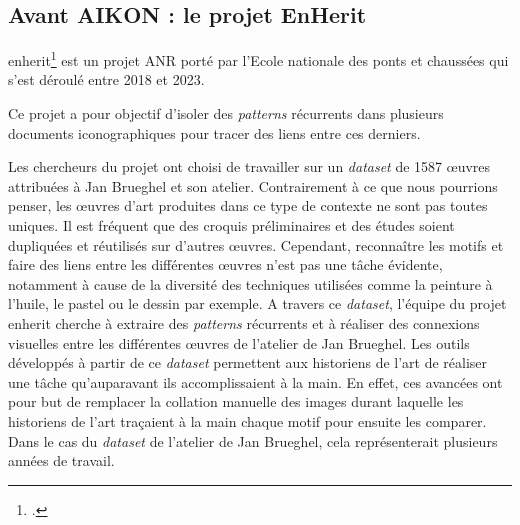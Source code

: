 \subsection{Avant AIKON : le projet EnHerit}

\gls{enherit}\footcite{EnHeritEnhancingHeritage} est un projet ANR porté par l'Ecole nationale des ponts et chaussées qui s'est déroulé entre 2018 et 2023.

Ce projet a pour objectif d'isoler des \textit{patterns} récurrents dans plusieurs documents iconographiques pour tracer des liens entre ces derniers.

Les chercheurs du projet ont choisi de travailler sur un \textit{dataset} de 1587 œuvres attribuées à Jan Brueghel et son atelier. Contrairement à ce que nous pourrions penser, les œuvres d'art produites dans ce type de contexte ne sont pas toutes uniques. Il est fréquent que des croquis préliminaires et des études soient dupliquées et réutilisés sur d'autres œuvres. Cependant, reconnaître les motifs et faire des liens entre les différentes œuvres n'est pas une tâche évidente, notamment à cause de la diversité des techniques utilisées comme la peinture à l'huile, le pastel ou le dessin par exemple. A travers ce \textit{dataset}, l'équipe du projet \gls{enherit} cherche à extraire des \textit{patterns} récurrents et à réaliser des connexions visuelles entre les différentes œuvres de l'atelier de Jan Brueghel. Les outils développés à partir de ce \textit{dataset} permettent aux historiens de l'art de réaliser une tâche qu'auparavant ils accomplissaient à la main. En effet, ces avancées ont pour but de remplacer la collation manuelle des images durant laquelle les historiens de l'art traçaient à la main chaque motif pour ensuite les comparer. Dans le cas du \textit{dataset} de l'atelier de Jan Brueghel, cela représenterait plusieurs années de travail.

